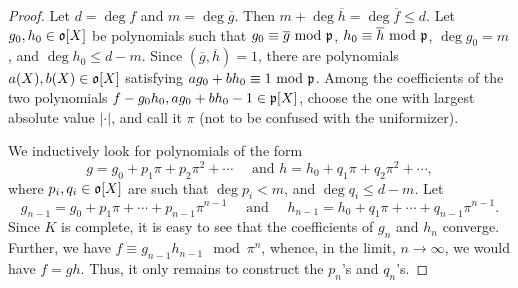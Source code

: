 \begin{proof}
    Let $d = \deg f$ and $m = \deg\overline g$. Then $m + \deg\overline h = \deg\overline f\le d$. Let $g_0, h_0\in\mathfrak{o}[X]$ be polynomials such that $g_0\equiv\overline g~\mathrm{mod}~\mathfrak{p}$, $h_0\equiv\overline h~\mathrm{mod}~\mathfrak{p}$, $\deg g_0 = m$, and $\deg h_0\le d - m$. Since $(\overline g, \overline h) = 1$, there are polynomials $a(X), b(X)\in\mathfrak{o}[X]$ satisfying $ag_0 + bh_0\equiv 1~\mathrm{mod}~\mathfrak{p}$. Among the coefficients of the two polynomials $f - g_0h_0, ag_0 + bh_0 - 1\in\mathfrak{p}[X]$, choose the one with largest absolute value $|\cdot|$, and call it $\pi$ (not to be confused with the uniformizer).

    We inductively look for polynomials of the form 
    \begin{equation*}
        g = g_0 + p_1\pi + p_2\pi^2 + \cdots\quad\text{ and } h = h_0 + q_1\pi + q_2\pi^2 + \cdots,
    \end{equation*}
    where $p_i,q_i\in\mathfrak{o}[X]$ are such that $\deg p_i < m$, and $\deg q_i\le d - m$. Let 
    \begin{equation*}
        g_{n - 1} = g_0 + p_1\pi + \cdots + p_{n - 1}\pi^{n - 1}\quad\text{ and }\quad h_{n - 1} = h_0 + q_1\pi + \cdots + q_{n - 1}\pi^{n - 1}.
    \end{equation*}
    Since $K$ is complete, it is easy to see that the coefficients of $g_n$ and $h_n$ converge. Further, we have $f\equiv g_{n - 1}h_{n - 1}\mod\pi^n$, whence, in the limit, $n\to\infty$, we would have $f = gh$. Thus, it only remains to construct the $p_n$'s and $q_n$'s.


\end{proof}
